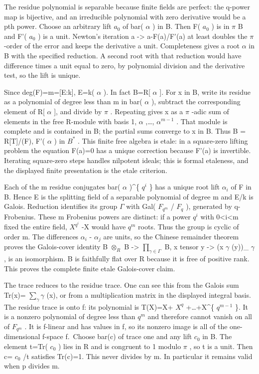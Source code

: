 \documentclass[
  11pt,
]{article}
\begin{document}
The residue polynomial is separable because finite fields are perfect:
the q-power map is bijective, and an irreducible polynomial with zero
derivative would be a pth power. Choose an arbitrary lift \(a_{0}\) of
bar( \(\alpha\) ) in B. Then F( \(a_{0}\) ) is in \(\pi\) B and F'(
\(a_{0}\) ) is a unit. Newton's iteration a -\textgreater{} a-F(a)/F'(a)
at least doubles the \(\pi\) -order of the error and keeps the
derivative a unit. Completeness gives a root \(\alpha\) in B with the
specified reduction. A second root with that reduction would have
difference times a unit equal to zero, by polynomial division and the
derivative test, so the lift is unique.

Since deg(F)=m={[}E:k{]}, E=k( \(\alpha\) ). In fact B=R{[} \(\alpha\)
{]}. For x in B, write its residue as a polynomial of degree less than m
in bar( \(\alpha\) ), subtract the corresponding element of R{[}
\(\alpha\) {]}, and divide by \(\pi\) . Repeating gives x as a \(\pi\)
-adic sum of elements in the free R-module with basis 1, \(\alpha\)
,\ldots, \(\alpha^{m-1}\) . That module is complete and is contained in
B; the partial sums converge to x in B. Thus B = R{[}T{]}/(F), F'(
\(\alpha\) ) in \(B^*\) . This finite free algebra is etale: in a
square-zero lifting problem the equation F(a)=0 has a unique correction
because F'(a) is invertible. Iterating square-zero steps handles
nilpotent ideals; this is formal etaleness, and the displayed finite
presentation is the etale criterion.

Each of the m residue conjugates bar( \(\alpha\) )\^{}\{ \(q^i\) \} has
a unique root lift \(\alpha_{i}\) of F in B. Hence E is the splitting
field of a separable polynomial of degree m and E/k is Galois. Reduction
identifies its group \(\Gamma\) with Gal( \(F_{q^m}\) / \(F_{q}\) ),
generated by q-Frobenius. These m Frobenius powers are distinct: if a
power \(q^i\) with 0\textless i\textless m fixed the entire field,
\(X^{q^i}\) -X would have \(q^m\) roots. Thus the group is cyclic of
order m. The differences \(\alpha_{i}\) - \(\alpha_{j}\) are units, so
the Chinese remainder theorem proves the Galois-cover identity B
\(\otimes_{R}\) B -\textgreater{} \(\prod_{\gamma\in \Gamma}\) B, x
tensor y \textbar-\textgreater{} (x \(\gamma\) (y))\_ \(\gamma\) , is an
isomorphism. B is faithfully flat over R because it is free of positive
rank. This proves the complete finite etale Galois-cover claim.

The trace reduces to the residue trace. One can see this from the Galois
sum Tr(x)= \(\sum_{\gamma} \gamma\) (x), or from a multiplication matrix
in the displayed integral basis. The residue trace is onto f: its
polynomial is T(X)=X+ \(X^q\) +\ldots+X\^{}\{ \(q^{m-1}\) \}. It is a
nonzero polynomial of degree less than \(q^m\) and therefore cannot
vanish on all of \(F_{q^m}\) . It is f-linear and has values in f, so
its nonzero image is all of the one-dimensional f-space f.~Choose bar(c)
of trace one and any lift \(c_{0}\) in B. The element t=Tr( \(c_{0}\) )
lies in R and is congruent to 1 modulo \(\pi\) , so t is a unit. Then c=
\(c_{0}\) /t satisfies Tr(c)=1. This never divides by m. In particular
it remains valid when p divides m.
\end{document}
